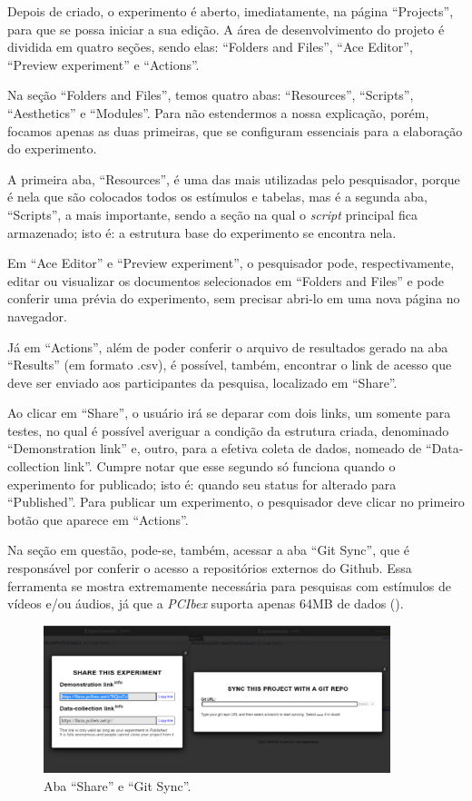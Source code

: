 \documentclass{textolivre}
\begin{document}
Depois de criado, o experimento é aberto, imediatamente, na página “Projects”, para que se possa iniciar a sua edição. A área de desenvolvimento do projeto é dividida em quatro seções, sendo elas: “Folders and Files”, “Ace Editor”, “Preview experiment” e “Actions”.

Na seção “Folders and Files”, temos quatro abas: “Resources”, “Scripts”, “Aesthetics” e “Modules”. Para não estendermos a nossa explicação, porém, focamos apenas as duas primeiras, que se configuram essenciais para a elaboração do experimento.

A primeira aba, “Resources”, é uma das mais utilizadas pelo pesquisador, porque é nela que são colocados todos os estímulos e tabelas, mas é a segunda aba, “Scripts”, a mais importante, sendo a seção na qual o \emph{script} principal fica armazenado; isto é: a estrutura base do experimento se encontra nela.  

Em “Ace Editor” e “Preview experiment”, o pesquisador pode, respectivamente, editar ou visualizar os documentos selecionados em “Folders and Files” e pode conferir uma prévia do experimento, sem precisar abri-lo em uma nova página no navegador.

Já em “Actions”, além de poder conferir o arquivo de resultados gerado na aba “Results” (em formato .csv), é possível, também, encontrar o link de acesso que deve ser enviado aos participantes da pesquisa, localizado em “Share”.

Ao clicar em “Share”, o usuário irá se deparar com dois links, um somente para testes, no qual é possível averiguar a condição da estrutura criada, denominado “Demonstration link” e, outro, para a efetiva coleta de dados, nomeado de “Data-collection link”. Cumpre notar que esse segundo só funciona quando o experimento for publicado; isto é: quando seu status for alterado para “Published”. Para publicar um experimento, o pesquisador deve clicar no primeiro botão que aparece em “Actions”.

Na seção em questão, pode-se, também, acessar a aba “Git Sync”, que é responsável por conferir o acesso a repositórios externos do Github. Essa ferramenta se mostra extremamente necessária para pesquisas com estímulos de vídeos e/ou áudios, já que a \emph{PCIbex} suporta apenas 64MB de dados ().

\begin{figure}[htbp]
 \centering
 \includegraphics[width=0.9\textwidth]{fig-007.png}
 \caption{Aba “Share” e “Git Sync”.}
 \label{fig7}
\end{figure}
\end{document}
